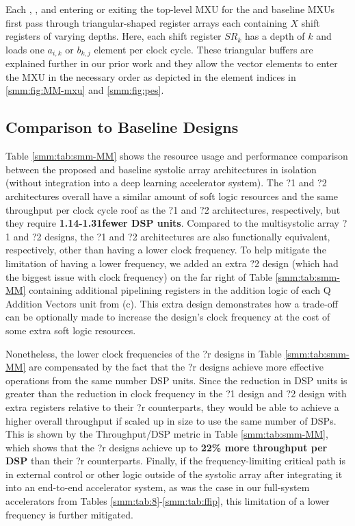 Each \A, \B, and \C \subblock entering or exiting the top-level MXU for the \smm and baseline MXUs first pass through triangular-shaped register arrays each containing $X$ shift registers of varying depths.
Here, each shift register $SR_k$ has a depth of $k$ and loads one $a_{i,k}$ or $b_{k,j}$ element per clock cycle.
These triangular buffers are explained further in our prior work \cite{pogue2024fast} and they allow the vector elements to enter the MXU in the necessary order as depicted in the element indices in \figs \ref{smm:fig:MM-mxu} and \ref{smm:fig:pes}.




\subsection{Comparison to Baseline Designs}
\label{smm:sec:results-baseline}


Table \ref{smm:tab:smm-MM} shows the resource usage and performance comparison between the proposed \smmArch and baseline \mm{/}\mmArch systolic array architectures in isolation (without integration into a deep learning accelerator system).
The \smmArch?1 and \smmArch?2 architectures overall have a similar amount of soft logic resources and the same throughput per clock cycle roof as the \mmArch?1 and \mmArch?2 architectures, respectively, but they require \textbf{1.14-1.31\x fewer DSP units}.
Compared to the multisystolic array \mm?1 and \mm?2 designs, the \smmArch?1 and \smmArch?2 architectures are also functionally equivalent, respectively, other than having a lower clock frequency.
To help mitigate the limitation of having a lower frequency, we added an extra \smmArch?2 design (which had the biggest issue with clock frequency) on the far right of Table \ref{smm:tab:smm-MM} containing additional pipelining registers in the addition logic of each Q Addition Vectors unit from  (c).
This extra design demonstrates how a trade-off can be optionally made to increase the design's clock frequency at the cost of some extra soft logic resources.

Nonetheless, the lower clock frequencies of the \smm?r designs in Table  \ref{smm:tab:smm-MM} are compensated by the fact that the \smm?r designs achieve more effective operations from the same number DSP units.
Since the reduction in DSP units is greater than the reduction in clock frequency in the \smm?1 design and \smm?2 design with extra registers relative to their \mm?r counterparts, they would be able to achieve a higher overall throughput if scaled up in size to use the same number of DSPs.
This is shown by the Throughput/DSP metric in Table  \ref{smm:tab:smm-MM}, which shows that the \smm?r designs achieve up to \textbf{22\% more throughput per DSP} than their \mm?r counterparts.
Finally, if the frequency-limiting critical path is in external control or other logic outside of the systolic array after integrating it into an end-to-end accelerator system, as was the case in our full-system accelerators from Tables \ref{smm:tab:8}-\ref{smm:tab:ffip}, this limitation of a lower frequency is further mitigated.

